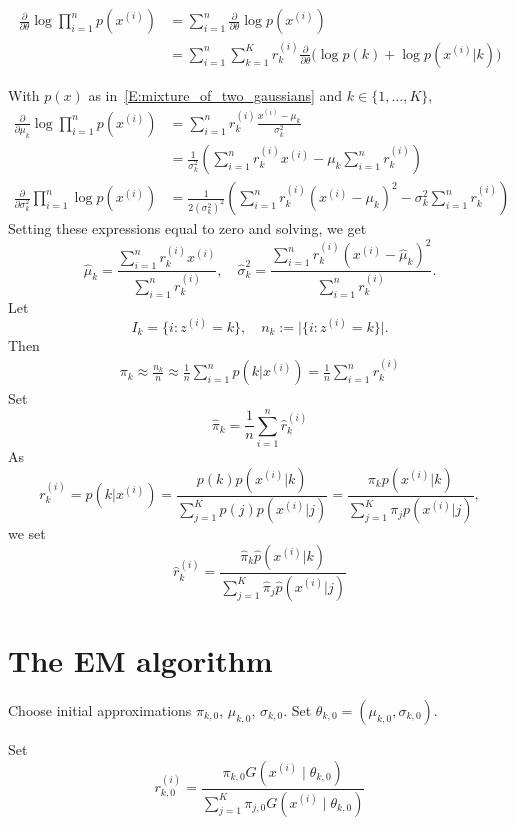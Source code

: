 \documentclass[12pt]{amsart}
\begin{document}
\begin{align*}
    \frac{\partial}{\partial \theta} \log \prod_{i=1}^n p(x^{(i)}) 
    &= \sum_{i=1}^n \frac{\partial}{\partial \theta} \log p(x^{(i)})\\
    &= \sum_{i=1}^n\sum_{k=1}^K r_k^{(i)}
    \frac{\partial}{\partial \theta}\big(\log p(k) + \log p(x^{(i)} | k)\big)
\end{align*}

With $p(x)$ as in~\eqref{E:mixture_of_two_gaussians} and $k\in\{1, \ldots, K\}$,
\begin{align*}
    \frac{\partial}{\partial \mu_k}\log \prod_{i=1}^n p(x^{(i)})
    &= \sum_{i=1}^n r^{(i)}_k\frac{x^{(i)}-\mu_k}{\sigma_k^2}\\
    &= \frac1{\sigma_k^2}\left(\sum_{i=1}^n r^{(i)}_kx^{(i)} - \mu_k\sum_{i=1}^n r^{(i)}_k\right)\\
    \frac{\partial}{\partial \sigma_k^2} \prod_{i=1}^n\log p(x^{(i)})
    &= \frac1{2(\sigma_k^2)^2}\left(\sum_{i=1}^n r^{(i)}_k(x^{(i)} - \mu_k)^2 - \sigma_k^2\sum_{i=1}^nr^{(i)}_k\right)
\end{align*}
Setting these expressions equal to zero and solving, we get
\[
    \hat \mu_k = \frac{\sum_{i=1}^n r^{(i)}_k x^{(i)}}{\sum_{i=1}^n r^{(i)}_k},\quad
    \hat \sigma_k^2 = \frac{\sum_{i=1}^n r^{(i)}_k(x^{(i)}-\hat\mu_k)^2}{\sum_{i=1}^n r^{(i)}_k}.
\]
Let
\[
    I_k = \{i : z^{(i)}=k\},\quad
    n_k := \big|\{i : z^{(i)} = k\}\big|. 
\]
Then
\begin{align*}
    \pi_k \approx \frac{n_k}{n}\approx \frac1n \sum_{i=1}^n p(k|x^{(i)}) = \frac1n\sum_{i=1}^n r^{(i)}_k
\end{align*}
Set
\[
    \hat\pi_k = \frac1n\sum_{i=1}^n \hat r_k^{(i)}
\]
As
\[
    r_k^{(i)} = p(k|x^{(i)})
    = \frac{p(k)p(x^{(i)}|k)}{\sum_{j=1}^Kp(j)p(x^{(i)}|j)}
    = \frac{\pi_k p(x^{(i)}|k)}{\sum_{j=1}^K\pi_j p(x^{(i)}|j)},
\]
we set
\[
    \hat r_k^{(i)} = \frac{\hat \pi_k \hat p(x^{(i)}|k)}{\sum_{j=1}^K \hat \pi_j \hat p(x^{(i)}|j)}
\]

\section{The EM algorithm}

Choose initial approximations $\pi_{k, 0}$, $\mu_{k, 0}$, $\sigma_{k, 0}$. Set $\theta_{k, 0} = (\mu_{k, 0}, \sigma_{k, 0})$.

Set
\[
    r_{k,0}^{(i)} = \frac{\pi_{k,0} G(x^{(i)} \mid \theta_{k, 0})}{\sum_{j=1}^K \pi_{j,0} G(x^{(i)}\mid\theta_{k, 0})}
\]
\end{document}
